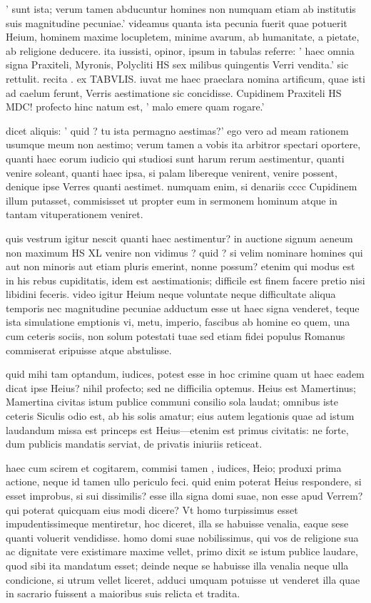  ' sunt ista; verum tamen abducuntur homines non numquam etiam ab institutis suis magnitudine pecuniae.' videamus quanta ista pecunia fuerit quae potuerit Heium, hominem maxime locupletem, minime avarum, ab humanitate, a pietate, ab religione deducere. ita iussisti, opinor, ipsum in tabulas referre: ' haec omnia signa Praxiteli, Myronis, Polycliti HS sex milibus quingentis Verri vendita.' sic rettulit. recita . ex TABVLIS. iuvat me haec praeclara nomina artificum, quae isti ad caelum ferunt, Verris aestimatione sic concidisse. Cupidinem Praxiteli HS MDC! profecto hinc natum est, ' malo emere quam rogare.'

 dicet aliquis: ' quid ? tu ista permagno aestimas?' ego vero ad meam rationem usumque meum non aestimo; verum tamen a vobis ita arbitror spectari oportere, quanti haec eorum iudicio qui studiosi sunt harum rerum aestimentur, quanti venire soleant, quanti haec ipsa, si palam libereque venirent, venire possent, denique ipse Verres quanti aestimet. numquam enim, si denariis cccc Cupidinem illum putasset, commisisset ut propter eum in sermonem hominum atque in tantam vituperationem veniret.

 quis vestrum igitur nescit quanti haec aestimentur? in auctione signum aeneum non maximum HS XL venire non vidimus ? quid ? si velim nominare homines qui aut non minoris aut etiam pluris emerint, nonne possum? etenim qui modus est in his rebus cupiditatis, idem est aestimationis; difficile est finem facere pretio nisi libidini feceris. video igitur Heium neque voluntate neque difficultate aliqua temporis nec magnitudine pecuniae adductum esse ut haec signa venderet, teque ista simulatione emptionis vi, metu, imperio, fascibus ab homine eo quem, una cum ceteris sociis, non solum potestati tuae sed etiam fidei populus Romanus commiserat eripuisse atque abstulisse.

 quid mihi tam optandum, iudices, potest esse in hoc crimine quam ut haec eadem dicat ipse Heius? nihil profecto; sed ne difficilia optemus. Heius est Mamertinus; Mamertina civitas istum publice communi consilio sola laudat; omnibus iste ceteris Siculis odio est, ab his solis amatur; eius autem legationis quae ad istum laudandum missa est princeps est Heius—etenim est primus civitatis: ne forte, dum publicis mandatis serviat, de privatis iniuriis reticeat.

 haec cum scirem et cogitarem, commisi tamen , iudices, Heio; produxi prima actione, neque id tamen ullo periculo feci. quid enim poterat Heius respondere, si esset improbus, si sui dissimilis? esse illa signa domi suae, non esse apud Verrem? qui poterat quicquam eius modi dicere? Vt homo turpissimus esset impudentissimeque mentiretur, hoc diceret, illa se habuisse venalia, eaque sese quanti voluerit vendidisse. homo domi suae nobilissimus, qui vos de religione sua ac dignitate vere existimare maxime vellet, primo dixit se istum publice laudare, quod sibi ita mandatum esset; deinde neque se habuisse illa venalia neque ulla condicione, si utrum vellet liceret, adduci umquam potuisse ut venderet illa quae in sacrario fuissent a maioribus suis relicta et tradita.

